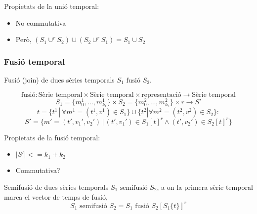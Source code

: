 Propietats de la unió temporal:
\begin{itemize}
\item No commutativa
\item Però, $(S_1 \cup^r S_2) \cup (S_2 \cup^r S_1) = S_1 \cup S_2$
\end{itemize}




\subsubsection{Fusió temporal}

Fusió (join) de dues sèries temporals $S_1 \text{ fusió } S_2$.


\begin{definition}
  \[
  \text{fusió}: \text{Sèrie temporal} \times
  \text{Sèrie temporal} \times \text{representació} \longrightarrow
  \text{Sèrie temporal}
  \]
  \[
  S_1 = \{m_0^1 , \ldots , m_{k_1}^1\} \times S_2 = \{m_0^2 , \ldots ,
  m_{k_2}^2\} \times r \longrightarrow S'
  \]
  \[
  t = \{t^1 \, | \, \forall m^1=(t^1,v^1) \in S_1\} \cup \{t^2 | \forall
  m^2=(t^2,v^2) \in S_2\}:
  \]
  \[
  S' = \{m'=(t',v_1',v_2') \, | \, (t',v_1') \in S_1[t]^r \wedge (t',v_2') \in S_2[t]^r \} 
  \]
\end{definition}



Propietats de la fusió temporal:
\begin{itemize}
\item $|S'| <= k_1 + k_2$
\item Commutativa?
\end{itemize}



Semifusió de dues sèries temporals $S_1 \text{ semifusió } S_2$, a on la primera sèrie temporal marca el vector de temps de fusió, 
\[
S_1 \text{ semifusió } S_2 = S_1 \text{ fusió } S_2[S_1\{t\}]^r
\]


















